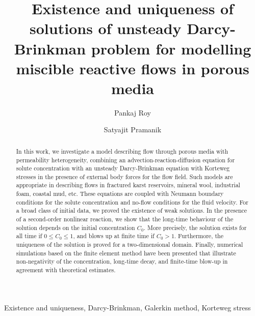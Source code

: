 \documentclass[final,3p,times]{elsarticle}
\theoremstyle{plain}
\theoremstyle{remark}
\theoremstyle{plain}
\theoremstyle{remark}
\begin{document}

\begin{frontmatter}


\title{Existence and uniqueness of solutions of unsteady Darcy-Brinkman problem for modelling miscible reactive flows in porous media} %
 \author{Pankaj Roy}
 \author{Satyajit Pramanik}



\begin{abstract}
In this work, we investigate a model describing flow through porous media with permeability heterogeneity, combining an advection-reaction-diffusion equation for solute concentration with an unsteady Darcy-Brinkman equation with Korteweg stresses in the presence of external body forces for the flow field. Such models are appropriate in describing flows in fractured karst reservoirs, mineral wool, industrial foam, coastal mud, etc. These equations are coupled with Neumann boundary conditions for the solute concentration and no-flow conditions for the fluid velocity. For a broad class of initial data, we proved the existence of weak solutions. In the presence of a second-order nonlinear reaction, we show that the long-time behaviour of the solution depends on the initial concentration \(C_0\). More precisely, the solution exists for all time if \(0\leq C_0\leq 1\), and blows up at finite time if $C_0>1$. Furthermore, the uniqueness of the solution is proved for a two-dimensional domain. Finally, numerical simulations based on the finite element method have been presented that illustrate non-negativity of the concentration, long-time decay, and finite-time blow-up in agreement with theoretical estimates. 
\end{abstract}

\begin{keyword}
Existence and uniqueness, Darcy-Brinkman, Galerkin method, Korteweg stress   \end{keyword}
\end{frontmatter}
 
\end{document}
